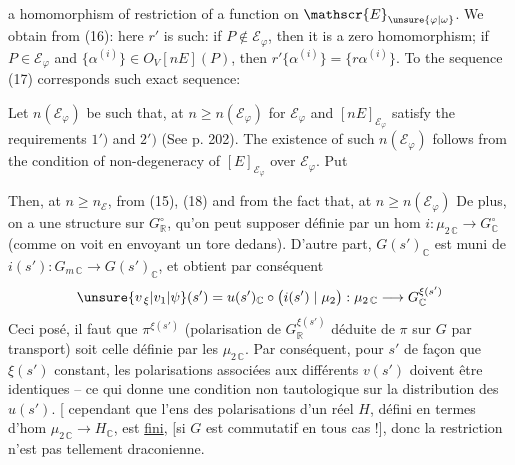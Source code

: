 a homomorphism of restriction of a function on $\mathscr{E}_{\unsure{\varphi|\omega}}$. We obtain from (16):
here $r'$ is such: if $P\notin\mathscr{E}_{\varphi}$, then it is a zero homomorphism; if $P\in\mathscr{E}_{\varphi}$ and $\{\alpha^{(i)}\}\in O_V[nE](P)$, then $r'\{\alpha^{(i)}\}=\{r\alpha^{(i)}\}$. To the sequence (17) corresponds such exact sequence:

Let $n(\mathscr{E}_{\varphi})$ be such that, at $n\geq n(\mathscr{E}_{\varphi})$ for $\mathscr{E}_{\varphi}$ and $[nE]_{\mathscr{E}_{\varphi}}$ satisfy the requirements $1')$ and $2')$ (See p. 202). The existence of such $n(\mathscr{E}_{\varphi})$ follows from the condition of non-degeneracy of $[E]_{\mathscr{E}_{\varphi}}$ over $\mathscr{E}_{\varphi}$. Put
\handwritten{\[
n_{\mathscr{E}}=\max(n'',\,n(\mathscr{E}_{\varphi})).
\]}

Then, at $n\geq n_{\mathscr{E}}$, from (15), (18) and from the fact that, at $n\geq n(\mathscr{E}_{\varphi})$
De plus, on a une structure \inserted{ $\pi$} sur $G_{\mathbb{R}}^{\circ}$, qu'on peut  supposer définie par un hom  $i:\mu_{2\,\mathbb{C}}\longrightarrow G_{\mathbb{C}}^{\circ}$ (comme on voit en envoyant un tore  dedans). D'autre part, $G(s')_{\mathbb{C}}$ est muni de $i(s'):G_{m\,\mathbb{C}}\to G(s')_{\mathbb{C}}$, et  obtient par conséquent
\[
\unsure{v_{\,\xi}|v_{1}|\psi}(s')=u(s')_{\mathbb{C}}\circ\bigl(i(s')\mid\mu_2\bigr):\mu_{2\,\mathbb{C}}\longrightarrow G_{\mathbb{C}}^{\xi(s')}
\]
 Ceci posé, il faut que $\pi^{\xi(s')}$ (polarisation de $G_{\mathbb{R}}^{\xi(s')}$ déduite de $\pi$ sur $G$ par transport) soit celle définie par les $\mu_{2\,\mathbb{C}}$. Par conséquent, pour $s'$  de façon que $\xi(s')$  constant, les polarisations  associées aux différents $v(s')$ doivent être identiques -- ce qui donne une condition non tautologique sur la distribution des  $u(s')$. [ cependant que l'ens des  polarisations d'un  réel $H$, défini en termes d'hom $\mu_{2\,\mathbb{C}}\to H_{\mathbb{C}}$,  est \uline{fini}, [si $G$ est commutatif en tous cas !], donc la restriction n'est pas tellement draconienne.

